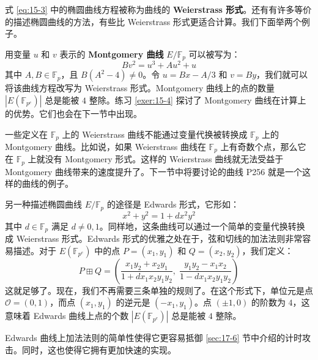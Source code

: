 式 \ref{eq:15-3} 中的椭圆曲线方程被称为曲线的 \textbf{Weierstrass 形式}。还有有许多等价的描述椭圆曲线的方法，有些比 Weierstrass 形式更适合计算。我们下面举两个例子。

\begin{snote}[Montgomery 曲线。]
用变量 $u$ 和 $v$ 表示的 \textbf{Montgomery 曲线} $E/\mathbb{F}_p$ 可以被写为：
\[
Bv^2=u^3+Au^2+u
\]
其中 $A,B\in\mathbb{F}_p$，且 $B(A^2-4)\neq0$。令 $u=Bx-{A/3}$ 和 $v=By$，我们就可以将该曲线方程改写为 Weierstrass 形式。Montgomery 曲线上的点的数量 $|E(\mathbb{F}_{p^e})|$ 总是能被 $4$ 整除。练习 \ref{exer:15-4} 探讨了 Montgomery 曲线在计算上的优势。它们也会在下一节中出现。

一些定义在 $\mathbb{F}_p$ 上的 Weierstrass 曲线不能通过变量代换被转换成 $\mathbb{F}_p$ 上的 Montgomery 曲线。比如说，如果 Weierstrass 曲线在 $\mathbb{F}_p$ 上有奇数个点，那么它在 $\mathbb{F}_p$ 上就没有 Montgomery 形式。这样的 Weierstrass 曲线就无法受益于 Montgomery 曲线带来的速度提升了。下一节中将要讨论的曲线 P256 就是一个这样的曲线的例子。
\end{snote}

\begin{snote}[Edwards 曲线。]
另一种描述椭圆曲线 $E/\mathbb{F}_p$ 的途径是 Edwards 形式，它形如：
\[
x^2+y^2=1+dx^2y^2
\]
其中 $d\in\mathbb{F}_p$ 满足 $d\neq0,1$。同样地，这条曲线可以通过一个简单的变量代换转换成 Weierstrass 形式。Edwards 形式的优雅之处在于，弦和切线的加法法则非常容易描述。对于 $E(\mathbb{F}_{p^e})$ 中的点 $P=(x_1,y_1)$ 和 $Q=(x_2,y_2)$，我们定义：
\[
P\boxplus Q=\left(\frac{x_1y_2+x_2y_1}{1+dx_1x_2y_1y_2},\;\frac{y_1y_2-x_1x_2}{1-dx_1x_2y_1y_2}\right)
\]
这就足够了。现在，我们不再需要三条单独的规则了。在这个形式下，单位元是点 $\mathcal{O}=(0,1)$，而点 $(x_1,y_1)$ 的逆元是 $(-x_1,y_1)$。点 $(\pm 1,0)$ 的阶数为 $4$，这意味着 Edwards 曲线上点的个数 $|E(\mathbb{F}_{p^e})|$ 总是能被 $4$ 整除。

Edwards 曲线上加法法则的简单性使得它更容易抵御 \ref{sec:17-6} 节中介绍的计时攻击。同时，这也使得它拥有更加快速的实现。
\end{snote}